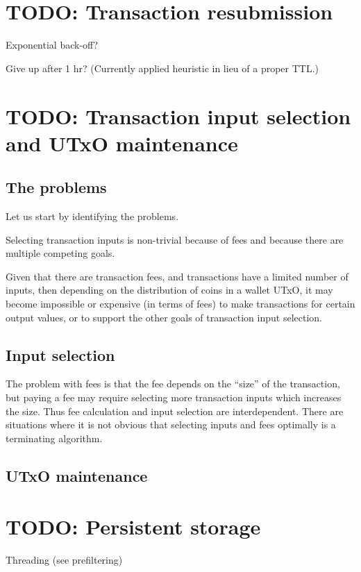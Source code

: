 \documentclass{article}
\begin{document}
\section{TODO: Transaction resubmission}

Exponential back-off?

Give up after 1 hr? (Currently applied heuristic in lieu of a proper TTL.)

\section{TODO: Transaction input selection and UTxO maintenance}

\subsection{The problems}

Let us start by identifying the problems.

Selecting transaction inputs is non-trivial because of fees and because there
are multiple competing goals.

Given that there are transaction fees, and transactions have a limited number
of inputs, then depending on the distribution of coins in a wallet UTxO, it
may become impossible or expensive (in terms of fees) to make transactions
for certain output values, or to support the other goals of transaction input
selection.

\subsection{Input selection}

The problem with fees is that the fee depends on the ``size'' of the
transaction, but paying a fee may require selecting more transaction inputs
which increases the size. Thus fee calculation and input
selection are interdependent. There are situations where it is not obvious that
selecting inputs and fees optimally is a terminating algorithm.

\subsection{UTxO maintenance}


\section{TODO: Persistent storage}

Threading (see prefiltering)
\end{document}

